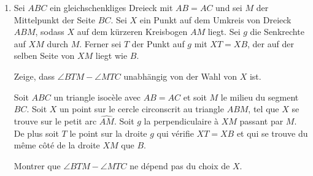 \documentclass[language=german,style=exam]{smo}
\begin{document}
\begin{enumerate}[label=\textbf{\arabic*.}]
{Für welche $n$ hat Quirin eine Gewinnstrategie?}
{Quirin et Romina jouent à un jeu sur un échiquier $n\times n$. Quirin commence et marque une des cases. Ensuite, ils marquent à tour de rôle une case vierge adjacente à la dernière case marquée. Le premier joueur qui n'a plus de coup valide a perdu.

Pour quelles valeurs de $n$ Quirin a-t-il une stratégie gagnante?}
{}

\bigskip\bigskip

\item\translation%
{Sei $ABC$ ein gleichschenkliges Dreieck mit $AB = AC$ und sei $M$ der Mittelpunkt der Seite $BC$. Sei $X$ ein Punkt auf dem Umkreis von Dreieck $ABM$, sodass $X$ auf dem kürzeren Kreisbogen $AM$ liegt. Sei $g$ die Senkrechte auf $XM$ durch $M$. Ferner sei $T$ der Punkt auf $g$ mit $XT = XB$, der auf der selben Seite von $XM$ liegt wie $B$.

Zeige, dass $\angle BTM - \angle MTC$ unabhängig von der Wahl von $X$ ist.}
{Soit $ABC$ un triangle isocèle avec $AB = AC$ et soit $M$ le milieu du segment $BC$. Soit $X$ un point sur le cercle circonscrit au triangle $ABM$, tel que $X$ se trouve sur le petit arc $\widehat{AM}$. Soit $g$ la perpendiculaire à $XM$ passant par $M$. De plus soit $T$ le point sur la droite $g$ qui vérifie $XT = XB$ et qui se trouve du même côté de la droite $XM$ que $B$.

Montrer que $\angle BTM - \angle MTC$ ne dépend pas du choix de $X$.}
{}

\end{enumerate}

\bigskip

\vspace{1cm}

\end{document}
